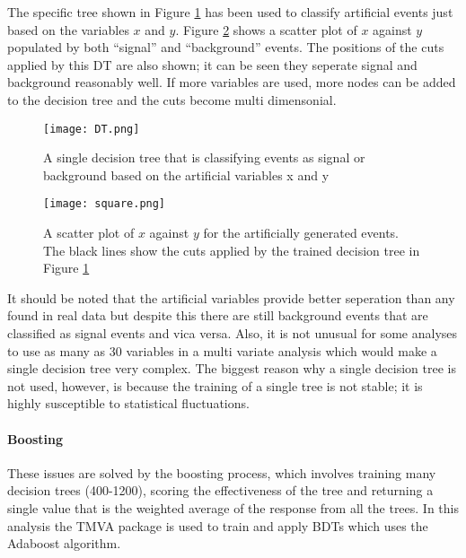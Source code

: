 The specific tree shown in Figure \ref{fig:DT} has been used to classify artificial events just based on the variables $x$ and $y$.  Figure \ref{fig:square} shows a scatter plot of $x$ against $y$ populated by both ``signal'' and ``background'' events.  The positions of the cuts applied by this DT are also shown; it can be seen they seperate signal and background reasonably well.  If more variables are used, more nodes can be added to the decision tree and the cuts become multi dimensonial.
\begin{figure}[h]
  \centering
  \texttt{[image: DT.png]}
  \caption{A single decision tree that is classifying events as signal or background based on the artificial variables x and y}
  \label{fig:DT}
\end{figure}
\begin{figure}[h]
  \centering
  \texttt{[image: square.png]}
  \caption{A scatter plot of $x$ against $y$ for the artificially generated events. The black lines show the cuts applied by the trained decision tree in Figure \ref{fig:DT}}
  \label{fig:square}
\end{figure}

It should be noted that the artificial variables provide better seperation than any found in real data but despite this there are still background events that are classified as signal events and vica versa. Also, it is not unusual for some analyses to use as many as 30 variables in a multi variate analysis which would make a single decision tree very complex.  The biggest reason why a single decision tree is not used, however, is because the training of a single tree is not stable; it is highly susceptible to statistical fluctuations.

\paragraph{Boosting}
These issues are solved by the boosting process, which involves training many decision trees (400-1200), scoring the effectiveness of the tree and returning a single value that is the weighted average of the response from all the trees.  In this analysis the TMVA package is used to train and apply BDTs which uses the Adaboost algorithm\cite{Hocker:2007ht}. 


